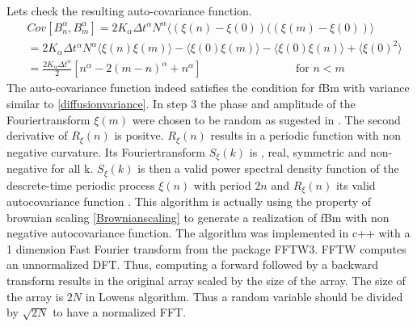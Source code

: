 \documentclass[
  a4paper,BCOR10mm,oneside,
  bibtotoc,idxtotoc,
  headsepline,footsepline,%
  fleqn,openbib
]{scrbook}
\begin{document}
Lets check the resulting auto-covariance function. 
\begin{align}
  & Cov[B^{\alpha}_n,B^{\alpha}_m]= 2 K_{\alpha} \Delta t^{\alpha} N^{\alpha} \langle (\xi(n)- \xi(0)) ((\xi(m)- \xi(0))\rangle \\
 &=  2 K_{\alpha} \Delta t^{\alpha} N^{\alpha}\langle\xi(n)\xi(m)\rangle -\langle \xi(0) \xi(m)\rangle - \langle \xi(0) \xi(n)\rangle +\langle \xi(0)^2\rangle \\ 
 &=\frac{2 K_{\alpha} \Delta t^{\alpha}}{2}[n^{\alpha}-2(m-n)^{\alpha}+n^{\alpha}]\qquad \qquad \qquad \qquad  \text{ for }  n < m
\end{align}
The auto-covariance function indeed satisfies the condition for fBm with variance similar to \cref{diffusionvariance}. In step 3 the phase and amplitude of the Fouriertransform  $\xi(m)$ were chosen to be random  as sugested in \cite{Timmer1995}. The second derivative of $R_{\xi}(n) $ is positve. $R_{\xi}(n) $ results in a periodic function with non negative curvature. Its Fouriertransform $S_{\xi}(k)$ is , real, symmetric  and non-negative for all k. $S_{\xi}(k)$ is then a valid power spectral density function of the descrete-time periodic process $\xi(n)$ with period $2n$ and  $R_{\xi}(n)$ its valid autocovariance function \cite{Lowen1999}. This algorithm is actually using the property of brownian scaling \cref{Brownianscaling} to generate a realization of fBm  with non negative autocovariance function. The algorithm was implemented in c++ with a 1 dimension Fast Fourier transform from the package FFTW3. FFTW computes an unnormalized DFT. Thus, computing a forward followed by a backward transform results in the original array scaled by the size of the array. The size of the array is $2N$  in Lowens algorithm. Thus a random variable should be divided by $\sqrt{2N}$ to have a normalized FFT.
\end{document}

